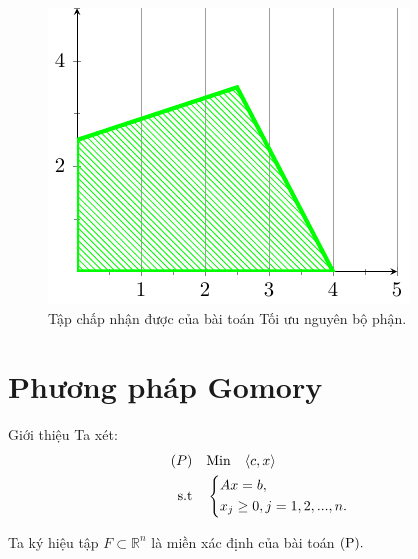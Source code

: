 \documentclass[10pt]{beamer}
\begin{document}
\begin{frame}
\begin{figure}[h]
    \centering
    \includegraphics[width=0.7\linewidth]{nguyenbophan.pdf}
    \caption{Tập chấp nhận được của bài toán Tối ưu nguyên bộ phận.}
\end{figure}
\end{frame}
    






































\section{Phương pháp Gomory}
\begin{frame}{Giới thiệu}
Ta xét:\\
    \begin{equation}
     \begin{split}
         {(P)} & \quad {\rm Min}  \quad\langle c,x \rangle\\
          \rm{s.t} &\quad \left\{\begin{split}
            & Ax= b,\\
           & x_j \ge 0, j=1,2,...,n.\\
           \end{split}\right.
       \end{split}
   \end{equation}

  Ta ký hiệu tập $ F \subset \mathbb R^n$ là miền xác định của bài toán ${\rm (P)}.$
\end{frame}
\end{document}

